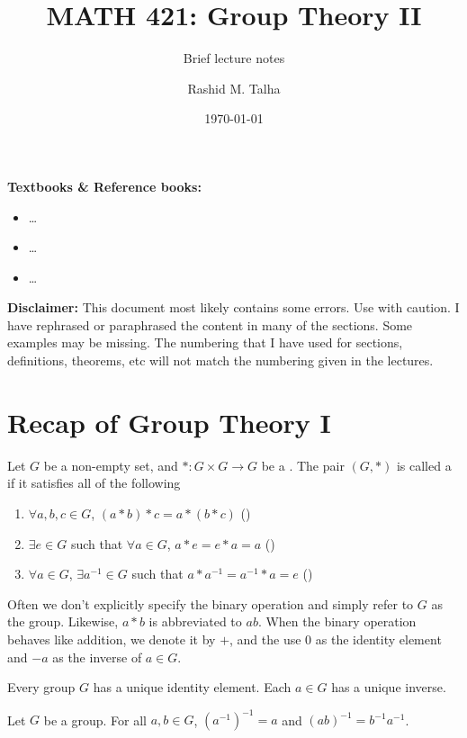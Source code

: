 \documentclass[11pt]{penrose}
\title{MATH 421: Group Theory II}
\subtitle{Brief lecture notes}
\author{Rashid M. Talha}
\affiliation{School of Natural Sciences, NUST}
\date{\today}
\begin{document}
\maketitle

\textbf{Textbooks \& Reference books:}
\begin{itemize}
    \item \dots
    \item \dots
    \item \dots
\end{itemize}

\textbf{Disclaimer:} This document most likely contains some errors. Use with caution. I have rephrased or paraphrased the content in many of the sections. Some examples may be missing. The numbering that I have used for sections, definitions, theorems, etc will not match the numbering given in the lectures.

\section{Recap of Group Theory I}
\begin{ndfn}[Group]
    Let $G$ be a non-empty set, and $* : G \times G \to G$ be a . The pair $(G, *)$ is called a  if it satisfies all of the following
    \begin{enumerate}
        \item $\forall a, b, c \in G$, $(a * b) * c = a * (b * c)$ \hfill()
        \item $\exists e \in G$ such that $\forall a \in G$, $a * e = e * a = a$ \hfill()
        \item $\forall a \in G$, $\exists a^{-1} \in G$ such that $a * a^{-1} = a^{-1} * a = e$ \hfill()
    \end{enumerate}
\end{ndfn}

Often we don't explicitly specify the binary operation and simply refer to $G$ as the group. Likewise, $a * b$ is abbreviated to $ab$. When the binary operation behaves like addition, we denote it by $+$, and the use $0$ as the identity element and $-a$ as the inverse of $a \in G$.

\begin{nthm}
    Every group $G$ has a unique identity element. Each $a \in G$ has a unique inverse.
\end{nthm}

\begin{nthm}
    Let $G$ be a group. For all $a, b \in G$, $(a^{-1})^{-1} = a$ and $(ab)^{-1} = b^{-1} a^{-1}$.
\end{nthm}
\end{document}
